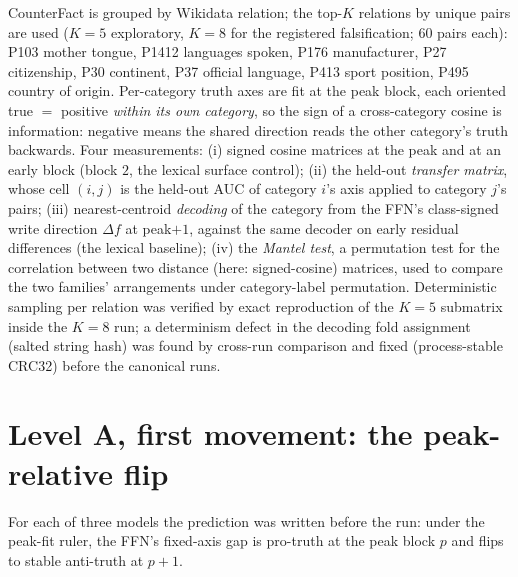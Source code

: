 \documentclass[11pt]{article}
\begin{document}
CounterFact is grouped by Wikidata relation; the top-$K$ relations by unique
pairs are used ($K{=}5$ exploratory, $K{=}8$ for the registered
falsification; $60$ pairs each): P103 mother tongue, P1412 languages spoken,
P176 manufacturer, P27 citizenship, P30 continent, P37 official language,
P413 sport position, P495 country of origin. Per-category truth axes are fit
at the peak block, each oriented true $=$ positive \emph{within its own
category}, so the sign of a cross-category cosine is information: negative
means the shared direction reads the other category's truth backwards. Four
measurements: (i) signed cosine matrices at the peak and at an early block
(block $2$, the lexical surface control); (ii) the held-out \emph{transfer
matrix}, whose cell $(i,j)$ is the held-out AUC of category $i$'s axis
applied to category $j$'s pairs; (iii) nearest-centroid \emph{decoding} of
the category from the FFN's class-signed write direction $\Delta f$ at
peak$+1$, against the same decoder on early residual differences (the
lexical baseline); (iv) the \emph{Mantel test}, a permutation test for the
correlation between two distance (here: signed-cosine) matrices, used to
compare the two families' arrangements under category-label permutation.
Deterministic sampling per relation was verified by exact reproduction of
the $K{=}5$ submatrix inside the $K{=}8$ run; a determinism defect in the
decoding fold assignment (salted string hash) was found by cross-run
comparison and fixed (process-stable CRC32) before the canonical runs.

\section{Level A, first movement: the peak-relative flip}
\label{sec:flip}

For each of three models the prediction was written before the run: under
the peak-fit ruler, the FFN's fixed-axis gap is pro-truth at the peak block
$p$ and flips to stable anti-truth at $p{+}1$.
\end{document}
